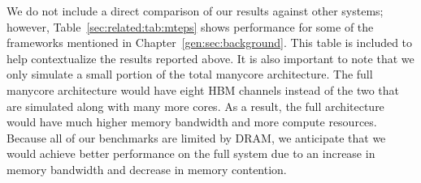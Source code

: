 \relatedMTEPSTable

We do not include a direct comparison of our results against other systems; however, Table~\ref{sec:related:tab:mteps} shows performance for some of the frameworks mentioned in Chapter~\ref{gen:sec:background}. This table is included to help contextualize the results reported above.
It is also important to note that we only simulate a small portion of the total manycore architecture. 
The full manycore architecture would have eight HBM channels instead of the two that are simulated along with many more cores.
As a result, the full architecture would have much higher memory bandwidth and more compute resources. 
Because all of our benchmarks are limited by DRAM, we anticipate that we would achieve better performance on the full system due to an increase in memory bandwidth and decrease in memory contention.

\overviewResultsTable